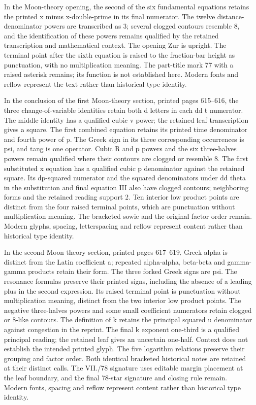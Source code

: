 In the Moon-theory opening, the second of the six fundamental equations retains the printed x minus x-double-prime in its final numerator. The twelve distance-denominator powers are transcribed as 3; several clogged contours resemble 8, and the identification of these powers remains qualified by the retained transcription and mathematical context. The opening Zur is upright. The terminal point after the sixth equation is raised to the fraction-bar height as punctuation, with no multiplication meaning. The part-title mark 77 with a raised asterisk remains; its function is not established here. Modern fonts and reflow represent the text rather than historical type identity.

In the conclusion of the first Moon-theory section, printed pages 615--616, the three change-of-variable identities retain both d letters in each dd t numerator. The middle identity has a qualified cubic v power; the retained leaf transcription gives a square. The first combined equation retains its printed time denominator and fourth power of p. The Greek sign in its three corresponding occurrences is psi, and tang is one operator. Cubic R and p powers and the six three-halves powers remain qualified where their contours are clogged or resemble 8. The first substituted x equation has a qualified cubic p denominator against the retained square. Its dp-squared numerator and the squared denominators under dd theta in the substitution and final equation III also have clogged contours; neighboring forms and the retained reading support 2. Ten interior low product points are distinct from the four raised terminal points, which are punctuation without multiplication meaning. The bracketed sowie and the original factor order remain. Modern glyphs, spacing, letterspacing and reflow represent content rather than historical type identity.

In the second Moon-theory section, printed pages 617--619, Greek alpha is distinct from the Latin coefficient a; repeated alpha-alpha, beta-beta and gamma-gamma products retain their form. The three forked Greek signs are psi. The resonance formulas preserve their printed signs, including the absence of a leading plus in the second expression. Its raised terminal point is punctuation without multiplication meaning, distinct from the two interior low product points. The negative three-halves powers and some small coefficient numerators retain clogged or 8-like contours. The definition of k retains the principal squared u denominator against congestion in the reprint. The final k exponent one-third is a qualified principal reading; the retained leaf gives an uncertain one-half. Context does not establish the intended printed glyph. The five logarithm relations preserve their grouping and factor order. Both identical bracketed historical notes are retained at their distinct calls. The VII./78 signature uses editable margin placement at the leaf boundary, and the final 78-star signature and closing rule remain. Modern fonts, spacing and reflow represent content rather than historical type identity.

